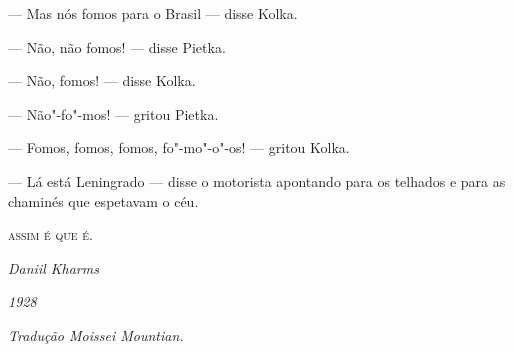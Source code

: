 --- Mas nós fomos para o Brasil --- disse Kolka.

--- Não, não fomos! --- disse Pietka.

--- Não, fomos! --- disse Kolka.

--- Não"-fo"-mos! --- gritou Pietka.

--- Fomos, fomos, fomos, fo"-mo"-o"-os! --- gritou Kolka.

--- Lá está Leningrado --- disse o motorista apontando para os telhados
e para as chaminés que espetavam o céu.

\bigskip

\hfill\textsc{assim é que é.}

\hfill\emph{Daniil Kharms}

\hfill\emph{1928}

\medskip

{\footnotesize\hfill\emph{Tradução Moissei Mountian.}}
